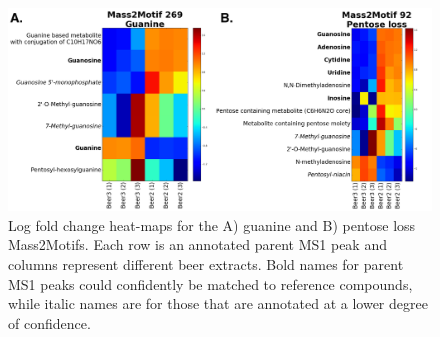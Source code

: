 
\begin{figure}[!htbp]
\centering\includegraphics[width=1.0\linewidth]{07-lda/figures/heatmaps.png}
\centering\caption[Log fold change heat-maps for the A) guanine and B) pentose loss Mass2Motifs. ]{Log fold change heat-maps for the A) guanine and B) pentose loss Mass2Motifs. Each row is an annotated parent MS1 peak and columns represent different beer extracts. Bold names for parent MS1 peaks could confidently be matched to reference compounds, while italic names are for those that are annotated at a lower degree of confidence. \label{fig:m2lda-heatmaps}}
\end{figure}

